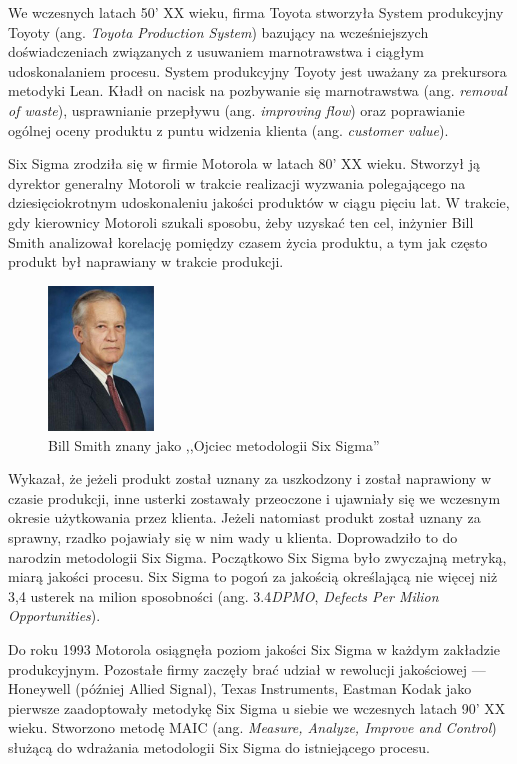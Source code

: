 We wczesnych latach 50' XX wieku, firma Toyota stworzyła System produkcyjny Toyoty (ang. \emph{Toyota Production System})
bazujący na wcześniejszych doświadczeniach związanych z usuwaniem marnotrawstwa i ciągłym
udoskonalaniem procesu. System produkcyjny Toyoty jest uważany za prekursora metodyki Lean. Kładł on nacisk na pozbywanie się marnotrawstwa (ang. \textit{removal of waste}), usprawnianie przepływu (ang. \textit{improving flow}) oraz 
poprawianie ogólnej oceny produktu z puntu widzenia klienta (ang. \emph{customer value}).

Six Sigma zrodziła się w firmie Motorola w latach 80' XX wieku. Stworzył ją 
dyrektor generalny Motoroli w trakcie realizacji wyzwania polegającego na dziesięciokrotnym udoskonaleniu jakości produktów w ciągu pięciu lat.
W trakcie, gdy kierownicy Motoroli szukali sposobu, żeby uzyskać ten cel, inżynier
Bill Smith analizował korelację pomiędzy czasem życia produktu, a tym jak często 
produkt był naprawiany w trakcie produkcji.
\begin{figure}[!htp]
	\centering
	\includegraphics[width=0.25\textwidth]{img/bill-smith2}
	\caption{Bill Smith znany jako ,,Ojciec metodologii Six Sigma''}
\end{figure}
Wykazał, że jeżeli produkt
został uznany za uszkodzony i został naprawiony w czasie produkcji, inne
usterki zostawały przeoczone i ujawniały się we wczesnym okresie użytkowania przez klienta. Jeżeli natomiast produkt został uznany za sprawny, rzadko pojawiały się 
w nim wady u klienta. Doprowadziło to do narodzin metodologii Six Sigma.
Początkowo Six Sigma było zwyczajną metryką, miarą jakości procesu.
Six Sigma to pogoń za jakością określającą nie więcej niż 3,4 usterek na milion sposobności
(ang. 3.4\emph{DPMO}, \emph{Defects Per Milion Opportunities}).

Do roku 1993 Motorola osiągnęła poziom jakości Six Sigma w każdym zakładzie produkcyjnym.
Pozostałe firmy zaczęły brać udział w rewolucji jakościowej ---
Honeywell (później Allied Signal), Texas Instruments, Eastman Kodak jako pierwsze
zaadoptowały metodykę Six Sigma u siebie we wczesnych latach 90' XX wieku.
Stworzono metodę MAIC (ang. \textit{Measure, Analyze, Improve and Control}) służącą
do  wdrażania metodologii Six Sigma do istniejącego procesu.

